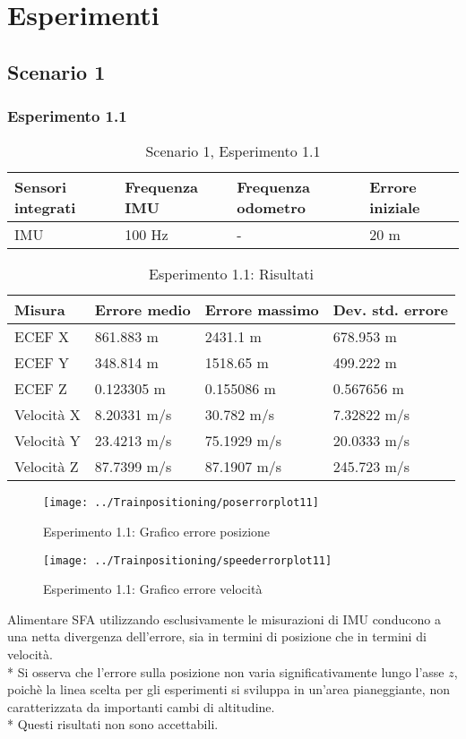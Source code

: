 \section{Esperimenti}
\subsection{Scenario 1}
\subsubsection{Esperimento 1.1}
	\begin{table}[h]
	\centering
	\begin{tabular}{|p{2.75cm}|p{2.75cm}|p{2.75cm}|p{2.75cm}|}
		\hline 
		\textbf{Sensori integrati} & \textbf{Frequenza IMU}  & \textbf{Frequenza odometro} & \textbf{Errore iniziale} \\ 
		\hline 
		IMU & 100 Hz & - & 20 m\\ 
		\hline 
	\end{tabular}
	\caption{Scenario 1, Esperimento 1.1}
	\label{tab:exp11}
\end{table}
	\begin{table}[h]
	\centering
	\begin{tabular}{|p{2cm}|p{3cm}|p{3cm}|p{3cm}|}
		\hline 
		\textbf{Misura} & \textbf{Errore medio}  & \textbf{Errore massimo} & \textbf{Dev. std. errore}\\ 
		\hline 
		ECEF X & 861.883 m & 2431.1 m & 678.953 m \\ 
		\hline 
		ECEF Y & 348.814 m & 1518.65 m & 499.222 m \\ 
		\hline 
		ECEF Z & 0.123305 m & 0.155086 m & 0.567656 m \\ 
		\hline 
		Velocit\`a X & 8.20331 m/s & 30.782 m/s & 7.32822 m/s \\ 
		\hline 
		Velocit\`a Y & 23.4213 m/s & 75.1929 m/s & 20.0333 m/s \\ 
		\hline 
		Velocit\`a Z & 87.7399 m/s & 87.1907 m/s & 245.723 m/s \\ 
		\hline 
	\end{tabular}
	\caption{Esperimento 1.1: Risultati}
	\label{tab:exp11res}
\end{table}
\FloatBarrier
\begin{figure}[h]
	\centering
	\texttt{[image: ../Trainpositioning/poserrorplot11]}
	\caption{Esperimento 1.1: Grafico errore posizione}
	\label{fig:poserrorplot11}
\end{figure}
\begin{figure}[h]
	\centering
	\texttt{[image: ../Trainpositioning/speederrorplot11]}
	\caption{Esperimento 1.1: Grafico errore velocit\`a}
	\label{fig:velerrorplot11}
\end{figure}
Alimentare SFA utilizzando esclusivamente le misurazioni di IMU conducono a una netta divergenza dell'errore, sia in termini di posizione che in termini di velocit\`a.\\*
Si osserva che l'errore sulla posizione non varia significativamente lungo l'asse $z$, poich\`e la linea scelta per gli esperimenti si sviluppa in un'area pianeggiante, non caratterizzata da importanti cambi di altitudine.\\*
Questi risultati non sono accettabili.
